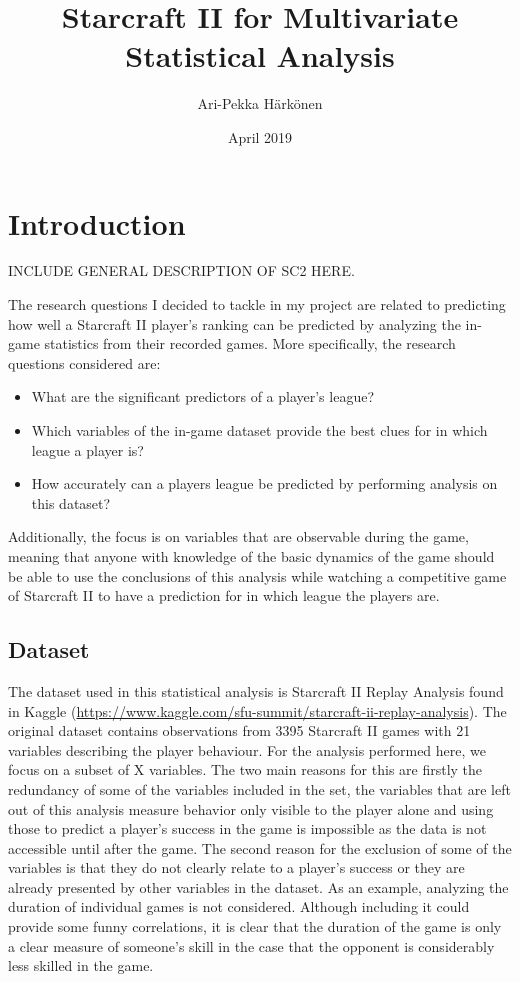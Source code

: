 \documentclass{article}
\title{Starcraft II for Multivariate Statistical Analysis}
\author{Ari-Pekka Härkönen}
\date{April 2019}
\begin{document}
\maketitle

\section{Introduction}
INCLUDE GENERAL DESCRIPTION OF SC2 HERE.

The research questions I decided to tackle in my project are related to predicting how well a Starcraft II player's ranking can be predicted by analyzing the in-game statistics from their recorded games. More specifically, the research questions considered are:

\begin{itemize}
    \item What are the significant predictors of a player's league?
    \item Which variables of the in-game dataset provide the best clues for in which league a player is?
    \item How accurately can a players league be predicted by performing analysis on this dataset?
\end{itemize}

Additionally, the focus is on variables that are observable during the game, meaning that anyone with knowledge of the basic dynamics of the game should be able to use the conclusions of this analysis while watching a competitive game of Starcraft II to have a prediction for in which league the players are.

\subsection{Dataset}
The dataset used in this statistical analysis is Starcraft II Replay Analysis found in Kaggle (\url{https://www.kaggle.com/sfu-summit/starcraft-ii-replay-analysis}). The original dataset contains observations from 3395 Starcraft II games with 21 variables describing the player behaviour. For the analysis performed here, we focus on a subset of X variables. The two main reasons for this are firstly the redundancy of some of the variables included in the set, the variables that are left out of this analysis measure behavior only visible to the player alone and using those to predict a player's success in the game is impossible as the data is not accessible until after the game. The second reason for the exclusion of some of the variables is that they do not clearly relate to a player's success or they are already presented by other variables in the dataset. As an example, analyzing the duration of individual games is not considered. Although including it could provide some funny correlations, it is clear that the duration of the game is only a clear measure of someone's skill in the case that the opponent is considerably less skilled in the game.
\end{document}
